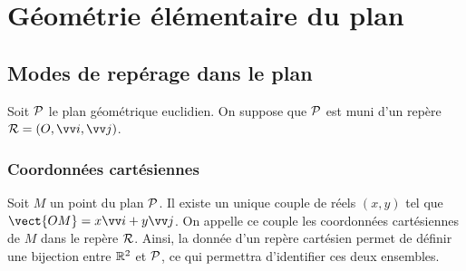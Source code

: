 \chapter{Géométrie élémentaire du plan}
\label{chap:geomplan}
\minitoc
\minilof
\minilot
\section{Modes de repérage dans le plan}
\label{sec:modederep}
Soit $\P$ le plan géométrique euclidien. On suppose que $\P$ est muni d'un repère $\Rep=(O,\vi, \vj)$.
%
\subsection{Coordonnées cartésiennes}
\label{subsec:coordcart}
\begin{defdef}
  Soit $M$ un point du plan $\P$. Il existe un unique couple de réels $(x,y)$ tel que $\vect{OM}=x\vi+y\vj$. On appelle ce couple les coordonnées cartésiennes de $M$ dans le repère $\Rep$. Ainsi, la donnée d'un repère cartésien permet de définir une bijection entre $\R^2$ et $\P$, ce qui permettra d'identifier ces deux ensembles. %
\end{defdef}
%
